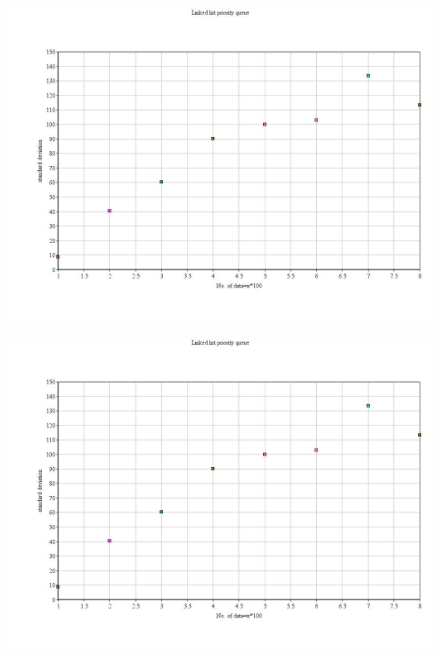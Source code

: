 \documentclass[11pt]{article} %
\begin{document}
\begin{figure}[ht!]
\centering
\includegraphics[width=120mm]{5.jpg}

\end{figure}
\begin{figure}[ht!]
\centering
\includegraphics[width=120mm]{6.jpg}

\end{figure}
\end{document}

